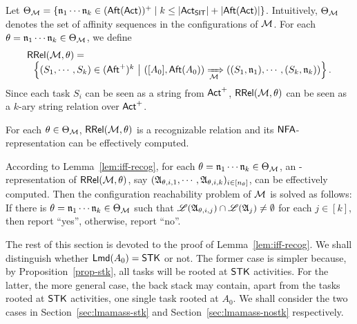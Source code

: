 
Let $\Theta_{\mathcal{M} } = \left \{ \mathfrak{n}_1 \cdots \mathfrak{n}_k \in ({\sf Aft}({\sf Act}))^+ \mid k \le |{\sf Act}_{{\sf SIT}}| + |{\sf Aft}({\sf Act})| \right\}$. Intuitively, $\Theta_{\mathcal{M} }$ denotes the set of affinity sequences  in the configurations of ${\mathcal{M} }$. For each $\theta=\mathfrak{n}_1 \cdots \mathfrak{n}_k \in \Theta_{\mathcal{M} }$, we define 
%
$$
\begin{array}{l}
\mathsf{RRel}({\mathcal{M} }, \theta) = \\
\ \ \left\{(S_1, \cdots, S_k) \in ({\sf Aft}^+)^k\ \big{\vert}\  ([A_0], {\sf Aft}(A_0)) \xRightarrow[{\mathcal{M} }]{} ((S_1, \mathfrak{n}_1), \cdots, (S_k, \mathfrak{n}_k)) \right\}.
\end{array}
$$ 
%
Since each task $S_i$ can be seen as a string from ${\sf Act}^+$, $\mathsf{RRel}({\mathcal{M} }, \theta)$ can be seen as a $k$-ary string relation over ${\sf Act}^+$. 


\begin{lemma}\label{lem:iff-recog}
    For each $\theta \in \Theta_{\mathcal{M} }$, $\mathsf{RRel}({\mathcal{M} }, \theta)$ is a recognizable relation and its $\textsf{NFA}$-representation can be effectively computed.
\end{lemma} 

According to Lemma~\ref{lem:iff-recog}, for each $\theta = \mathfrak{n}_1 \cdots \mathfrak{n}_k \in \Theta_{\mathcal{M} }$, an {\NFA}-representation of $\mathsf{RRel}({\mathcal{M} }, \theta)$, say $({\mathfrak{A} }_{\theta, i,1},\cdots,{\mathfrak{A} }_{\theta, i,k})_{i \in [n_\theta]}$, can be effectively computed. 
Then the configuration reachability problem of ${\mathcal{M} }$ is solved as follows: If there is $\theta =  \mathfrak{n}_1 \cdots \mathfrak{n}_k \in \Theta_{\mathcal{M} }$ such that ${\mathscr{L} }({\mathfrak{A} }_{\theta, i, j}) \cap {\mathscr{L} }({\mathfrak{A} }_j) \neq \emptyset$ for each $j \in [k]$, then report ``yes'', otherwise, report ``no''.

The rest of this section is devoted to the proof of Lemma~\ref{lem:iff-recog}. We shall distinguish whether ${\sf Lmd}(A_0) = \mathsf{STK}$ or not. 
The former case is simpler because, by Proposition~\ref{prop-stk}, all tasks will be rooted at $\mathsf{STK}$ activities. For the latter, the more general case, the back stack may contain, apart from the tasks rooted at $\mathsf{STK}$ activities, one single task rooted at $A_0$. 
We shall consider the two cases in Section~\ref{sec:lmamass-stk} and Section~\ref{sec:lmamass-nostk} respectively.

